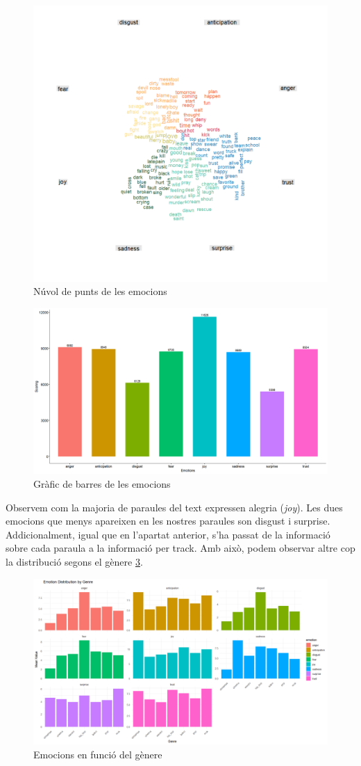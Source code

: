 \begin{figure}[H]
    \centering
    \includegraphics[width=0.7\linewidth]{Images//8_Textual//Analysis/emotions_cloud.png}
    \caption{Núvol de punts de les emocions}
    \label{fig:textual_emotions_cloud}
\end{figure}

\begin{figure}[H]
    \centering
    \includegraphics[width=0.7\linewidth]{Images//8_Textual//Analysis/emotions_scoring.png}
    \caption{Gràfic de barres de les emocions}
    \label{fig:textual_emotions_bar}
\end{figure}

Observem com la majoria de paraules del text expressen alegria (\textit{joy}). Les dues emocions que menys apareixen en les nostres paraules son disgust i surprise. Addicionalment, igual que en l'apartat anterior, s'ha passat de la informació sobre cada paraula a la informació per track. Amb això, podem observar altre cop la distribució segons el gènere \ref{fig:textual_emotions_genre}.

\begin{figure}[H]
    \centering
    \includegraphics[width=0.7\linewidth]{Images//8_Textual//Analysis/mean_emotions_genre.png}
    \caption{Emocions en funció del gènere}
    \label{fig:textual_emotions_genre}
\end{figure}

